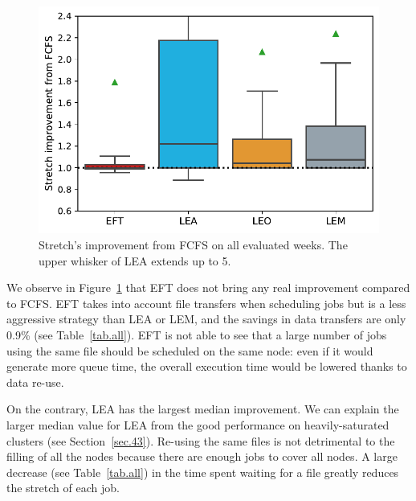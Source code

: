 \documentclass[conference]{IEEEtran}
\begin{document}
\begin{figure}[t]\centering\includegraphics[width=0.9\linewidth]{../MBSS/plot/Boxplot/byuser/box_plot_stretch_all-all_1.pdf}\caption{Stretch's improvement from FCFS on all evaluated weeks. The upper whisker of LEA extends up to 5.}\label{boxplot.all}\end{figure}

We observe in Figure~\ref{boxplot.all} that EFT does not bring any real improvement compared to FCFS.
EFT takes into account file transfers when scheduling jobs but is a less aggressive strategy than LEA or LEM, and the savings in data transfers are only 0.9\% (see Table~\ref{tab.all}).
EFT is not able to see that a large number of jobs using the same file
should be scheduled on the same node: even if it would generate more
queue time, the overall execution time would be lowered thanks to data re-use.

\begin{table}
\end{table}

On the contrary, LEA has the largest median improvement.
We can explain the larger median value for LEA from the good performance on heavily-saturated clusters (see Section~\ref{sec.43}).
Re-using the same files is not detrimental to the filling of all the nodes because there are enough jobs to cover all nodes.
A large decrease (see Table~\ref{tab.all}) in the time spent waiting for a file greatly reduces the stretch of each job.
\end{document}
